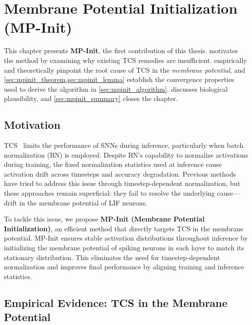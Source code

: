 \chapter{Membrane Potential Initialization (MP-Init)}
\label{ch:mpinit}

This chapter presents \textbf{MP-Init}, the first contribution of this thesis.  motivates the method by examining why existing TCS remedies are insufficient.  empirically and theoretically pinpoint the root cause of TCS in the \emph{membrane potential}, and \cref{sec:mpinit_theorem,sec:mpinit_lemma} establish the convergence properties used to derive the algorithm in \cref{sec:mpinit_algorithm}.  discusses biological plausibility, and \cref{sec:mpinit_summary} closes the chapter.

\section{Motivation}
\label{sec:mpinit_motivation}

TCS~\cite{bntt:2020, tebn:2022, tab:2024} limits the performance of SNNs during inference, particularly when batch normalization (BN) is employed. Despite BN's capability to normalize activations during training, the fixed normalization statistics used at inference cause activation drift across timesteps and accuracy degradation. Previous methods~\cite{tebn:2022, tab:2024} have tried to address this issue through timestep-dependent normalization, but these approaches remain superficial: they fail to resolve the underlying cause—drift in the membrane potential of LIF neurons.

To tackle this issue, we propose \textbf{MP-Init (Membrane Potential Initialization)}, an efficient method that directly targets TCS in the membrane potential. MP-Init ensures stable activation distributions throughout inference by initializing the membrane potential of spiking neurons in each layer to match its stationary distribution. This eliminates the need for timestep-dependent normalization and improves final performance by aligning training and inference statistics.

\section{Empirical Evidence: TCS in the Membrane Potential}
\label{sec:mpinit_empirical}

